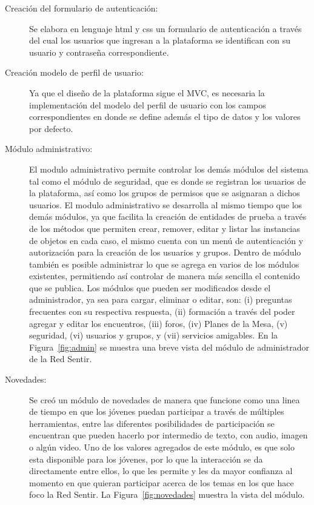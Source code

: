 \documentclass[a4paper]{article}
\begin{document}
\begin{description}
\item[Creación del formulario de autenticación:] Se elabora en lenguaje html y css un formulario de autenticación a través del cual los usuarios que ingresan a la plataforma se identifican con su usuario y contraseña correspondiente.

\item[Creación modelo de perfil de usuario:] Ya que el diseño de la plataforma sigue el MVC, es necesaria la implementación del modelo del perfil de usuario con los campos correspondientes en donde se define además el tipo de datos y los valores por defecto.

\item[Módulo administrativo:] El modulo administrativo permite controlar los demás módulos del sistema tal como el módulo de seguridad, que es donde se registran los usuarios de la plataforma, así como los grupos de permisos que se asignaran a dichos usuarios. El modulo administrativo se desarrolla al mismo tiempo que los demás módulos, ya que facilita la creación de entidades de prueba a través de los métodos que permiten crear, remover, editar y listar  las instancias de objetos en cada caso, el mismo cuenta con un menú de autenticación y autorización para la creación de los usuarios y grupos. Dentro de módulo también es posible administrar lo que se agrega en varios de los módulos existentes, permitiendo así controlar de manera más sencilla el contenido que se publica. Los módulos que pueden ser modificados desde el administrador, ya sea para cargar, eliminar o editar, son: (i) preguntas frecuentes con su respectiva respuesta, (ii) formación a través del poder agregar y editar los encuentros, (iii) foros, (iv) Planes de la Mesa, (v) seguridad, (vi) usuarios y grupos, y (vii) servicios amigables. En la Figura~\ref{fig:admin} se muestra una breve vista del módulo de administrador de la Red Sentir.

\item[Novedades:] Se creó un módulo de novedades de manera que funcione como una linea de tiempo en que los jóvenes puedan participar a través de múltiples herramientas, entre las diferentes posibilidades de participación se encuentran que pueden hacerlo por intermedio de texto, con audio, imagen o algún video. Uno de los valores agregados de este módulo, es que solo esta disponible para los jóvenes, por lo que la interacción se da directamente entre ellos, lo que les permite y les da mayor confianza al momento en que quieran participar acerca de los temas en los que hace foco la Red Sentir. La Figura~\ref{fig:novedades} muestra la vista del módulo.


\end{description}
\end{document}
